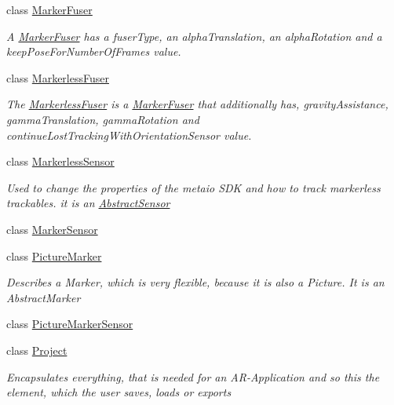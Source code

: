 \begin{DoxyCompactItemize}
class \hyperlink{class_a_rdev_kit_1_1_model_1_1_project_1_1_marker_fuser}{Marker\-Fuser}
\begin{DoxyCompactList}\small\item\em A \hyperlink{class_a_rdev_kit_1_1_model_1_1_project_1_1_marker_fuser}{Marker\-Fuser} has a fuser\-Type, an alpha\-Translation, an alpha\-Rotation and a keep\-Pose\-For\-Number\-Of\-Frames value. \end{DoxyCompactList}\item 
class \hyperlink{class_a_rdev_kit_1_1_model_1_1_project_1_1_markerless_fuser}{Markerless\-Fuser}
\begin{DoxyCompactList}\small\item\em The \hyperlink{class_a_rdev_kit_1_1_model_1_1_project_1_1_markerless_fuser}{Markerless\-Fuser} is a \hyperlink{class_a_rdev_kit_1_1_model_1_1_project_1_1_marker_fuser}{Marker\-Fuser} that additionally has, gravity\-Assistance, gamma\-Translation, gamma\-Rotation and continue\-Lost\-Tracking\-With\-Orientation\-Sensor value. \end{DoxyCompactList}\item 
class \hyperlink{class_a_rdev_kit_1_1_model_1_1_project_1_1_markerless_sensor}{Markerless\-Sensor}
\begin{DoxyCompactList}\small\item\em Used to change the properties of the metaio S\-D\-K and how to track markerless trackables. it is an \hyperlink{class_a_rdev_kit_1_1_model_1_1_project_1_1_abstract_sensor}{Abstract\-Sensor} \end{DoxyCompactList}\item 
class \hyperlink{class_a_rdev_kit_1_1_model_1_1_project_1_1_marker_sensor}{Marker\-Sensor}
\item 
class \hyperlink{class_a_rdev_kit_1_1_model_1_1_project_1_1_picture_marker}{Picture\-Marker}
\begin{DoxyCompactList}\small\item\em Describes a Marker, which is very flexible, because it is also a Picture. It is an Abstract\-Marker \end{DoxyCompactList}\item 
class \hyperlink{class_a_rdev_kit_1_1_model_1_1_project_1_1_picture_marker_sensor}{Picture\-Marker\-Sensor}
\item 
class \hyperlink{class_a_rdev_kit_1_1_model_1_1_project_1_1_project}{Project}
\begin{DoxyCompactList}\small\item\em Encapsulates everything, that is needed for an A\-R-\/\-Application and so this the element, which the user saves, loads or exports \end{DoxyCompactList}\item 

\end{DoxyCompactItemize}
